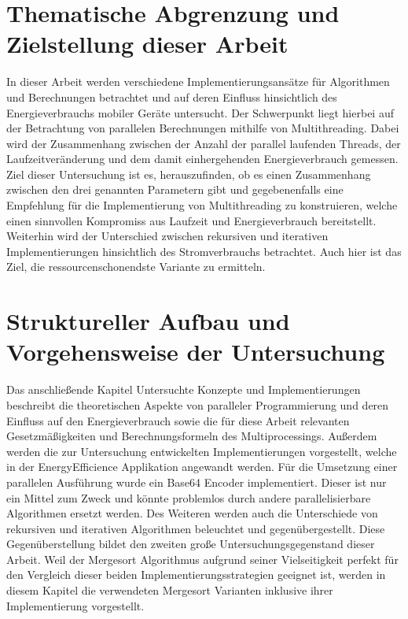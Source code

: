 \section{Thematische Abgrenzung und Zielstellung dieser Arbeit}

In dieser Arbeit werden verschiedene Implementierungsansätze für Algorithmen und Berechnungen betrachtet und auf deren Einfluss hinsichtlich des Energieverbrauchs mobiler Geräte untersucht. Der Schwerpunkt liegt hierbei auf der Betrachtung von parallelen Berechnungen mithilfe von Multithreading. Dabei wird der Zusammenhang zwischen der Anzahl der parallel laufenden Threads, der Laufzeitveränderung und dem damit einhergehenden Energieverbrauch gemessen.
Ziel dieser Untersuchung ist es, herauszufinden, ob es einen Zusammenhang zwischen den drei genannten Parametern gibt und gegebenenfalls eine Empfehlung für die Implementierung von Multithreading zu konstruieren, welche einen sinnvollen Kompromiss aus Laufzeit und Energieverbrauch bereitstellt.
Weiterhin wird der Unterschied zwischen rekursiven und iterativen Implementierungen hinsichtlich des Stromverbrauchs betrachtet. Auch hier ist das Ziel, die ressourcenschonendste Variante zu ermitteln.


\section{Struktureller Aufbau und Vorgehensweise der Untersuchung}

Das anschließende Kapitel \glqq Untersuchte Konzepte und Implementierungen\grqq{} beschreibt die theoretischen Aspekte von paralleler Programmierung und deren Einfluss auf den Energieverbrauch sowie die für diese Arbeit relevanten Gesetzmäßigkeiten und Berechnungsformeln des Multiprocessings. Außerdem werden die zur Untersuchung entwickelten Implementierungen vorgestellt, welche in der \glqq EnergyEfficience\grqq{} Applikation angewandt werden. Für die Umsetzung einer parallelen Ausführung wurde ein Base64 Encoder implementiert. Dieser ist nur ein Mittel zum Zweck und könnte problemlos durch andere parallelisierbare Algorithmen ersetzt werden. Des Weiteren werden auch die Unterschiede von rekursiven und iterativen Algorithmen beleuchtet und gegenübergestellt. Diese Gegenüberstellung bildet den zweiten große Untersuchungsgegenstand dieser Arbeit. Weil der Mergesort Algorithmus aufgrund seiner Vielseitigkeit perfekt für den Vergleich dieser beiden Implementierungsstrategien geeignet ist, werden in diesem Kapitel die verwendeten Mergesort Varianten inklusive ihrer Implementierung vorgestellt.

